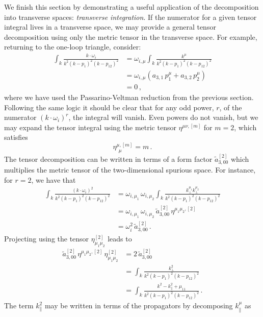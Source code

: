 We finish this section by demonstrating a useful application of the
decomposition into transverse spaces: \emph{transverse integration}. If the numerator
for a given tensor integral lives in a transverse space, we may provide a
general tensor decomposition using only the metric tensor in the transverse
space. For example, returning to the one-loop triangle, consider:
\begin{align}
  \int_k \frac{k\cdot\omega_i}{k^2 (k-p_1)^2 (k-p_{12})^2}  
  &= \omega_{i,\mu} \int_k \frac{k^\mu}{k^2 (k-p_1)^2 (k-p_{12})^2} \nonumber \\
    &= \omega_{i,\mu}  \left(a_{3,1} \, p_1^\mu + a_{3,2} \, p_2^{\mu}\right) \nonumber \\
    & = 0\,,
\end{align}
where we have used the Passarino-Veltman reduction from the previous section.
Following the same logic it should be clear that for any odd power, $r$, of the
numerator $(k\cdot\omega_i)^r$, the integral will vanish. Even powers do not
vanish, but we may expand the tensor integral using the metric tensor
$\eta^{\mu\nu, [m]}$ for $m=2$, which satisfies
\begin{equation}
  \eta_{\ \ \mu}^{\mu, [m]} = m\,.
\end{equation}
The tensor decomposition can be written in terms of a form factor
$\tilde{a}_{3,00}^{[2]}$ which multiplies the metric tensor of the two-dimensional
spurious space. For instance, for $r=2$, we have that
\begin{align}
  \int_k \frac{(k\cdot \omega_i)^2}{k^2 (k-p_1)^2 (k-p_{12})^2} 
  &= \omega_{i,\mu_1} \, \omega_{i,\mu_2} \int_k \frac{k_\perp^{\mu_1} k_\perp^{\mu_2}}{k^2 (k-p_1)^2 (k-p_{12})^2} \nonumber\\
  &= \omega_{i,\mu_1} \, \omega_{i,\mu_2} \, \tilde{a}_{3,00}^{[2]} \, \eta^{\mu_1\mu_2, [2]} \nonumber\\
  &= \omega_i^2 \, \tilde{a}_{3,00}^{[2]} \,.
  \label{eq:triwsqtransverseint}
\end{align}
Projecting using the tensor $\eta_{\mu_1\mu_2}^{[2]}$ leads to
\begin{align}
  \tilde{a}_{3,00}^{[2]} \, \eta^{\mu_1\mu_2, [2]} \, \eta_{\mu_1\mu_2}^{[2]} &= 2 \, \tilde{a}_{3,00}^{[2]} \\
   &= \int_k \frac{k_\perp^2}{k^2 (k-p_1)^2 (k-p_{12})^2} \\
   &= \int_k \frac{k^2-k_{\parallel}^2+\mu_{11}}{k^2 (k-p_1)^2 (k-p_{12})^2}\,.
\end{align}
The term $k_{\parallel}^2$ may be written in terms of the propagators by decomposing $k^{\mu}_{\parallel}$ as
